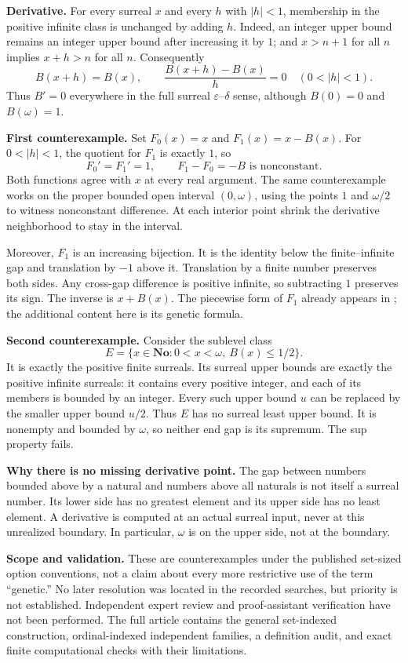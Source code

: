 \documentclass[11pt,letterpaper]{article}
\newcommand{\No}{\mathbf{No}}
\begin{document}
\noindent\textbf{Derivative.} For every surreal $x$ and every $h$ with
$|h|<1$, membership in the positive infinite class is unchanged by adding
$h$. Indeed, an integer upper bound remains an integer upper bound after
increasing it by $1$; and $x>n+1$ for all $n$ implies $x+h>n$ for all $n$.
Consequently
\[
 B(x+h)=B(x),\qquad
 \frac{B(x+h)-B(x)}h=0\quad(0<|h|<1).
\]
Thus $B'=0$ everywhere in the full surreal $\varepsilon$--$\delta$ sense,
although $B(0)=0$ and $B(\omega)=1$.

\newpage
\noindent\textbf{First counterexample.} Set $F_0(x)=x$ and $F_1(x)=x-B(x)$.
For $0<|h|<1$, the quotient for $F_1$ is exactly $1$, so
\[
 F_0'=F_1'=1,\qquad F_1-F_0=-B\text{ is nonconstant}.
\]
Both functions agree with $x$ at every real argument. The same counterexample
works on the proper bounded open interval $(0,\omega)$, using the points
$1$ and $\omega/2$ to witness nonconstant difference. At each interior
point shrink the derivative neighborhood to stay in the interval.

Moreover, $F_1$ is an increasing bijection. It is the identity below the
finite--infinite gap and translation by $-1$ above it. Translation by a
finite number preserves both sides. Any cross-gap difference is positive
infinite, so subtracting $1$ preserves its sign. The inverse is $x+B(x)$.
The piecewise form of $F_1$ already appears in \cite[p.~37, eq.~(7)]{RSS};
the additional content here is its genetic formula.

\noindent\textbf{Second counterexample.} Consider the sublevel class
\[
 E=\{x\in\No:0<x<\omega,\ B(x)\le1/2\}.
\]
It is exactly the positive finite surreals. Its surreal upper bounds are
exactly the positive infinite surreals: it contains every positive integer,
and each of its members is bounded by an integer. Every such upper bound
$u$ can be replaced by the smaller upper bound $u/2$. Thus $E$ has no
surreal least upper bound. It is nonempty and bounded by $\omega$, so
neither end gap is its supremum. The sup property fails.

\noindent\textbf{Why there is no missing derivative point.} The gap between
numbers bounded above by a natural and numbers above all naturals is not
itself a surreal number. Its lower side has no greatest element and its
upper side has no least element. A derivative is computed at an actual
surreal input, never at this unrealized boundary. In particular, $\omega$
is on the upper side, not at the boundary.

\noindent\textbf{Scope and validation.} These are counterexamples under the
published set-sized option conventions, not a claim about every more
restrictive use of the term ``genetic.'' No later resolution was located
in the recorded searches, but priority is not established. Independent
expert review and proof-assistant verification have not been performed.
The full article contains the general set-indexed construction,
ordinal-indexed independent families, a definition audit, and exact finite
computational checks with their limitations.
\end{document}
